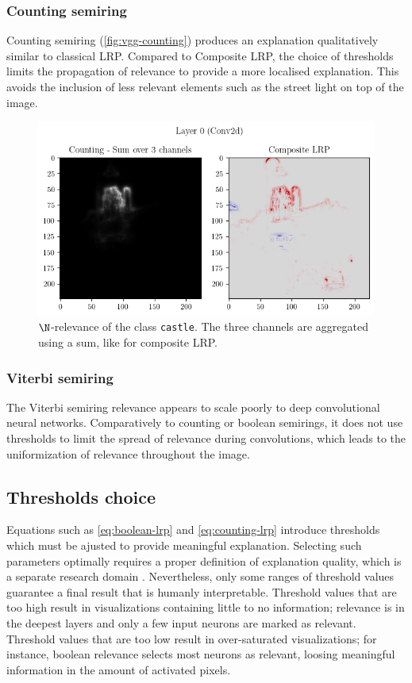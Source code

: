 \documentclass[twocolumn]{../cs-classes/cs-classes}
\newcommand*{\1}{\digitsbb{1}}
\newcommand*{\0}{\digitsbb{0}}
\begin{document}
\subsubsection{Counting semiring}
Counting semiring (\autoref{fig:vgg-counting}) produces an explanation qualitatively similar to classical LRP. Compared to Composite LRP, the choice of thresholds limits the propagation of relevance to provide a more localised explanation. This avoids the inclusion of less relevant elements such as the street light on top of the image.
\begin{figure}[H]
    \centering
    \includegraphics[width=\linewidth]{vgg-counting.png}
    \caption{$\N$-relevance of the class \texttt{castle}. The three channels are aggregated using a sum, like for composite LRP.}
    \label{fig:vgg-counting}
\end{figure}

\subsubsection{Viterbi semiring}
The Viterbi semiring relevance appears to scale poorly to deep convolutional neural networks. Comparatively to counting or boolean semirings, it does not use thresholds to limit the spread of relevance during convolutions, which leads to the uniformization of relevance throughout the image.


\subsection{Thresholds choice}
\label{sec:thresholds-choice}
Equations such as \ref{eq:boolean-lrp} and \ref{eq:counting-lrp} introduce thresholds which must be ajusted to provide meaningful explanation. Selecting such parameters optimally requires a proper definition of explanation quality, which is a separate research domain \cite{samek2016evaluating}. Nevertheless, only some ranges of threshold values guarantee a final result that is humanly interpretable. Threshold values that are too high result in visualizations containing little to no information; relevance is  in the deepest layers and only a few input neurons are marked as relevant. Threshold values that are too low result in over-saturated visualizations; for instance, boolean relevance selects most neurons as relevant, loosing meaningful information in the amount of activated pixels.
\end{document}
